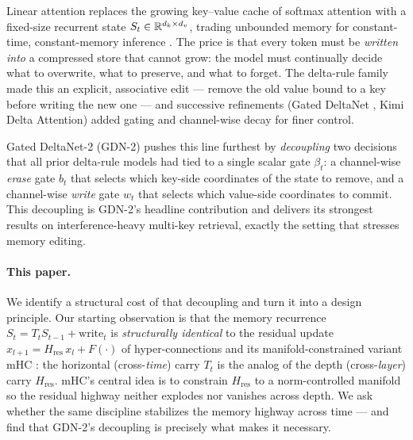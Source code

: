 \documentclass[11pt,letterpaper,logo]{yalearxiv}
\newcommand{\Tcarry}{T}          %
\newcommand{\Hres}{H_{\mathrm{res}}}
\begin{document}
Linear attention replaces the growing key--value cache of softmax attention with a
fixed-size recurrent state $S_t \in \mathbb{R}^{d_k \times d_v}$, trading unbounded memory
for constant-time, constant-memory inference \citep{katharopoulos2020transformers}.
The price is that every token must be \emph{written into} a compressed store that
cannot grow: the model must continually decide what to overwrite, what to preserve,
and what to forget. The delta-rule family \citep{schlag2021linear,yang2024parallelizing}
made this an explicit, associative edit --- remove the old value bound to a key
before writing the new one \citep{schlag2021linear,yang2024parallelizing} --- and
successive refinements
(Gated DeltaNet \citep{yang2024gdn}, Kimi Delta Attention) added gating and
channel-wise decay for finer control.

Gated DeltaNet-2 (GDN-2) \citep{hatamizadeh2026gdn2} pushes this line furthest by
\emph{decoupling} two decisions that all prior delta-rule models had tied to a
single scalar gate $\beta_t$: a channel-wise \emph{erase} gate $b_t$ that selects
which key-side coordinates of the state to remove, and a channel-wise \emph{write}
gate $w_t$ that selects which value-side coordinates to commit. This decoupling is
GDN-2's headline contribution and delivers its strongest results on
interference-heavy multi-key retrieval, exactly the setting that stresses memory
editing.

\paragraph{This paper.} We identify a structural cost of that decoupling and turn it
into a design principle. Our starting observation is that the memory recurrence
$S_t = \Tcarry_t S_{t-1} + \text{write}_t$ is \emph{structurally identical} to the
residual update $x_{l+1} = \Hres\, x_l + F(\cdot)$ of hyper-connections
\citep{zhu2024hyperconnections} and its manifold-constrained variant mHC
\citep{deepseek2025mhc}: the horizontal (cross-\emph{time}) carry $\Tcarry_t$ is the
analog of the depth (cross-\emph{layer}) carry $\Hres$. mHC's central idea is to
constrain $\Hres$ to a norm-controlled manifold so the residual highway neither
explodes nor vanishes across depth. We ask whether the same discipline stabilizes
the memory highway across time --- and find that GDN-2's decoupling is precisely
what makes it necessary.
\end{document}
